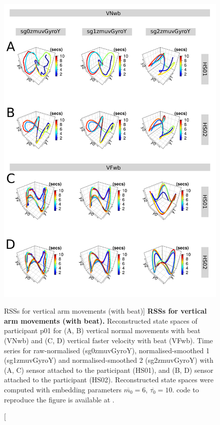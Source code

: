\begin{figure}
\centering
\includegraphics[height=0.8\textheight]{fig_5_08}
\caption
	[RSSs for vertical arm movements (with beat)]{
	{\bf RSSs for vertical arm movements (with beat).}
	Reconstructed state spaces of participant p01 for 
	(A, B) vertical normal movements with beat (VNwb) and 
	(C, D) vertical faster velocity with beat (VFwb).
	Time series for raw-normalised (sg0zmuvGyroY), 
	normalised-smoothed 1 (sg1zmuvGyroY) and 
	normalised-smoothed 2 (sg2zmuvGyroY) with
	(A, C) sensor attached to the participant (HS01), and
	(B, D) sensor attached to the participant (HS02).	
	Reconstructed state spaces were computed with 
	embedding parameters $\overline{m_0}=6$, $\overline{\tau_0}=10$.
	\R code to reproduce the figure is available at 
	.
        }
     \label{fig:rss_Vwb_w500}
\end{figure}

